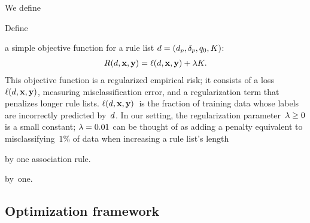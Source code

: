 \begin{arxiv}
We define
\end{arxiv}
\begin{kdd}
Define
\end{kdd}
a simple objective function for a rule list ${{d} = (d_p, \delta_p, q_0, K)}$:
\begin{align}
R({d}, \mathbf{x}, \mathbf{y}) = \ell({d}, \mathbf{x}, \mathbf{y}) + {\lambda} K.
\label{eq:objective}
\end{align}
This objective function is a regularized empirical risk;
it consists of a loss~$\ell({d}, \mathbf{x}, \mathbf{y})$, measuring misclassification error,
and a regularization term that penalizes longer rule lists.
%
$\ell({d}, \mathbf{x}, \mathbf{y})$~is the fraction of training data whose labels are
incorrectly predicted by~${d}$.
%
In our setting, the regularization parameter~${{\lambda} \ge 0}$ is a small constant;
\eg ${{\lambda} = 0.01}$ can be thought of as adding a penalty equivalent to misclassifying~$1\%$
of data when increasing a rule list's length
\begin{arxiv}
by one association rule.
\end{arxiv}
\begin{kdd}
by~one.
\end{kdd}
%

\subsection{Optimization framework}
\label{sec:optimization}

